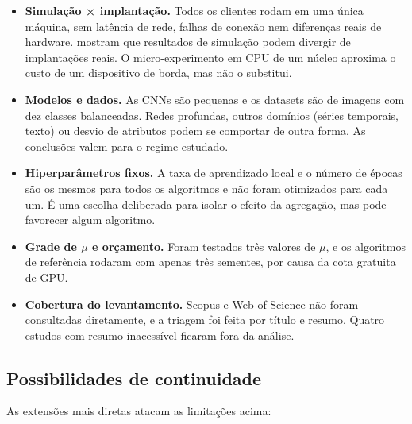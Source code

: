 \begin{itemize}[leftmargin=*, itemsep=2pt]
    \item \textbf{Simulação × implantação.} Todos os clientes rodam em uma única máquina, sem latência de rede, falhas de conexão nem diferenças reais de hardware. \citet{valli2026beyond} mostram que resultados de simulação podem divergir de implantações reais. O micro-experimento em CPU de um núcleo aproxima o custo de um dispositivo de borda, mas não o substitui.
    \item \textbf{Modelos e dados.} As CNNs são pequenas e os datasets são de imagens com dez classes balanceadas. Redes profundas, outros domínios (séries temporais, texto) ou desvio de atributos podem se comportar de outra forma. As conclusões valem para o regime estudado.
    \item \textbf{Hiperparâmetros fixos.} A taxa de aprendizado local e o número de épocas são os mesmos para todos os algoritmos e não foram otimizados para cada um. É uma escolha deliberada para isolar o efeito da agregação, mas pode favorecer algum algoritmo.
    \item \textbf{Grade de $\mu$ e orçamento.} Foram testados três valores de $\mu$, e os algoritmos de referência rodaram com apenas três sementes, por causa da cota gratuita de GPU.
    \item \textbf{Cobertura do levantamento.} Scopus e Web of Science não foram consultadas diretamente, e a triagem foi feita por título e resumo. Quatro estudos com resumo inacessível ficaram fora da análise.
\end{itemize}

\subsection{Possibilidades de continuidade}

As extensões mais diretas atacam as limitações acima:

